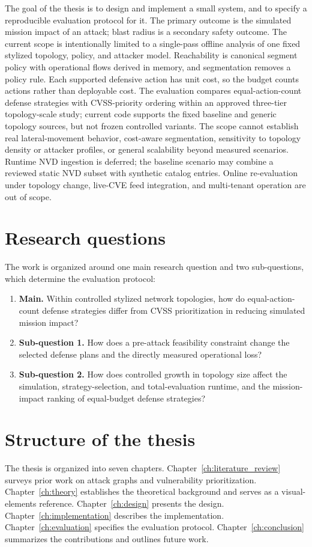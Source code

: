 The goal of the thesis is to design and implement a small system, and to specify a reproducible evaluation protocol for it. The primary outcome is the simulated mission impact of an attack; blast radius is a secondary safety outcome. The current scope is intentionally limited to a single-pass offline analysis of one fixed stylized topology, policy, and attacker model. Reachability is canonical segment policy with operational flows derived in memory, and segmentation removes a policy rule. Each supported defensive action has unit cost, so the budget counts actions rather than deployable cost. The evaluation compares equal-action-count defense strategies with CVSS-priority ordering within an approved three-tier topology-scale study; current code supports the fixed baseline and generic topology sources, but not frozen controlled variants. The scope cannot establish real lateral-movement behavior, cost-aware segmentation, sensitivity to topology density or attacker profiles, or general scalability beyond measured scenarios. Runtime NVD ingestion is deferred; the baseline scenario may combine a reviewed static NVD subset with synthetic catalog entries. Online re-evaluation under topology change, live-CVE feed integration, and multi-tenant operation are out of scope.

\section{Research questions}
\label{ch:intro:questions}

The work is organized around one main research question and two sub-questions, which determine the evaluation protocol:

\begin{enumerate}
	\item \textbf{Main.} Within controlled stylized network topologies, how do equal-action-count defense strategies differ from CVSS prioritization in reducing simulated mission impact?
	\item \textbf{Sub-question 1.} How does a pre-attack feasibility constraint change the selected defense plans and the directly measured operational loss?
	\item \textbf{Sub-question 2.} How does controlled growth in topology size affect the simulation, strategy-selection, and total-evaluation runtime, and the mission-impact ranking of equal-budget defense strategies?
\end{enumerate}

\section{Structure of the thesis}
\label{ch:intro:structure}

The thesis is organized into seven chapters. Chapter~\ref{ch:literature_review} surveys prior work on attack graphs and vulnerability prioritization. Chapter~\ref{ch:theory} establishes the theoretical background and serves as a visual-elements reference. Chapter~\ref{ch:design} presents the design. Chapter~\ref{ch:implementation} describes the implementation. Chapter~\ref{ch:evaluation} specifies the evaluation protocol. Chapter~\ref{ch:conclusion} summarizes the contributions and outlines future work.
